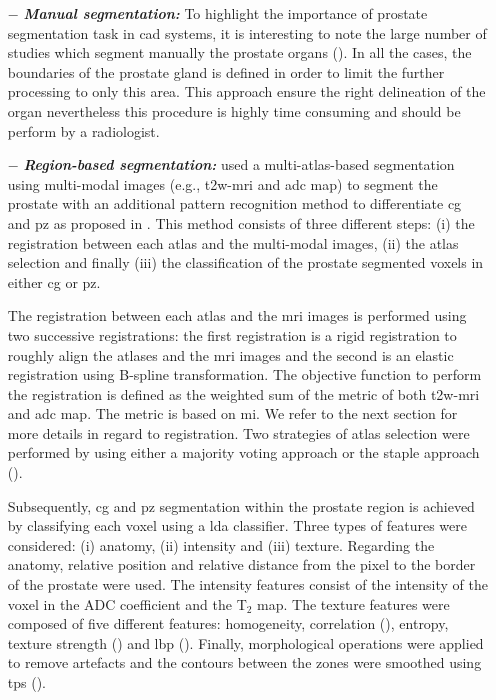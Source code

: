 \begin{enumerate}[leftmargin=*]

\item[$-$] \textbf{\textit{Manual segmentation:}} To highlight the importance of prostate segmentation task in \ac{cad} systems, it is interesting to note the large number of studies which segment manually the prostate organs (\cite{Artan2009,Artan2010,Matulewicz2013,Niaf2011,Niaf2012,Ozer2009,Ozer2010,Puech2009,Vos2008,Vos2008a}). In all the cases, the boundaries of the prostate gland is defined in order to limit the further processing to only this area. This approach ensure the right delineation of the organ nevertheless this procedure is highly time consuming and should be perform by a radiologist.

\item[$-$] \textbf{\textit{Region-based segmentation:}} \cite{Litjens2012} used a multi-atlas-based segmentation using multi-modal images (e.g., \ac{t2w}-\ac{mri} and \ac{adc} map) to segment the prostate with an additional pattern recognition method to differentiate \ac{cg} and \ac{pz} as proposed in \cite{Litjens2012a}. This method consists of three different steps: (i) the registration between each atlas and the multi-modal images, (ii) the atlas selection and finally (iii) the classification of the prostate segmented voxels in either \ac{cg} or \ac{pz}. 

The registration between each atlas and the \ac{mri} images is performed using two successive registrations: the first registration is a rigid registration to roughly align the atlases and the \ac{mri} images and the second is an elastic registration using B-spline transformation. The objective function to perform the registration is defined as the weighted sum of the metric of both \ac{t2w}-\ac{mri} and \ac{adc} map. The metric is based on \ac{mi}. We refer to the next section for more details in regard to registration. Two strategies of atlas selection were performed by using either a majority voting approach or the \ac{staple} approach (\cite{Warfield2004}).

Subsequently,  \ac{cg} and \ac{pz} segmentation within the prostate region is achieved by classifying each voxel using a \ac{lda} classifier. Three types of features were considered: (i) anatomy, (ii) intensity and (iii) texture. Regarding the anatomy, relative position and relative distance from the pixel to the border of the prostate were used. The intensity features consist of the intensity of the voxel in the ADC coefficient and the T$_2$ map. The texture features were composed of five different features: homogeneity, correlation (\cite{Amadasun1989}), entropy, texture strength (\cite{Li2005a}) and \ac{lbp} (\cite{Ojala1996}). Finally, morphological operations were applied to remove artefacts and the contours between the zones were smoothed using \ac{tps} (\cite{Bookstein1989}).


\end{enumerate}
